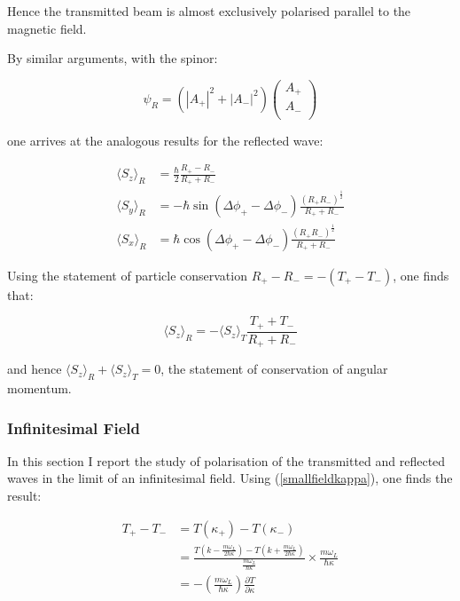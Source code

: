 \documentclass{article}
\begin{document}
\noindent Hence the transmitted beam is almost exclusively polarised parallel to the magnetic field.

\noindent By similar arguments, with the spinor:

\begin{equation}
	\psi_R = (|A_{+}|^2+|A_{-}|^2)
	\begin{pmatrix}
		A_{+}\\
		A_{-}\\
	\end{pmatrix}
\end{equation}

\noindent one arrives at the analogous results for the reflected wave:

\begin{align}
	\langle S_z \rangle_R &= \frac{\hbar}{2}\frac{R_+-R_-}{R_++R_-}\\
	\langle S_y \rangle_R &= -\hbar \sin{(\Delta\phi_+-\Delta\phi_-)}\frac{(R_+R_-)^{\frac{1}{2}}}{R_++R_-}\\
	\langle S_x \rangle_R &= \hbar \cos{(\Delta\phi_+-\Delta\phi_-)}\frac{(R_+R_-)^{\frac{1}{2}}}{R_++R_-}
\end{align}

\noindent Using the statement of particle conservation $R_+-R_-=-(T_+-T_-)$, one finds that:

\begin{equation}
	\langle S_z \rangle_R = -\langle S_z \rangle_T \frac{T_++T_-}{R_++R_-} 
\end{equation}

\noindent and hence $\langle S_z \rangle_R + \langle S_z \rangle_T = 0$, the statement of conservation of angular momentum. 

\subsubsection{Infinitesimal Field}
In this section I report the study of polarisation of the transmitted and reflected waves in the limit of an infinitesimal field. Using (\ref{smallfieldkappa}), one finds the result:

\begin{align}
	T_+-T_- &= T(\kappa_+)-T(\kappa_-)\\
		&= \frac{T(k-\frac{m\omega_L}{2\hbar\kappa})-T(k+\frac{m\omega_L}{2\hbar\kappa})}{\frac{m\omega_L}{\hbar\kappa}}\times \frac{m\omega_L}{\hbar\kappa} \\
		&=-\left(\frac{m\omega_L}{\hbar\kappa}\right)\frac{\partial T}{\partial \kappa} \label{netT}
\end{align}
\end{document}
